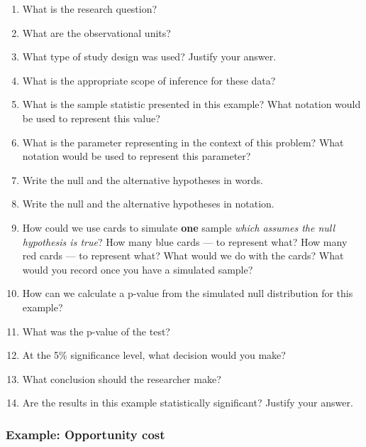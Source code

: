 \documentclass[
]{report}
\newcommand{\rgs}{\vspace{12pt}} %
\begin{document}
\begin{enumerate}
\def\labelenumi{\arabic{enumi}.}
\item
  What is the research question?
  \rgs
\item
  What are the observational units?
  \rgs
\item
  What type of study design was used? Justify your answer.
  \rgs
\item
  What is the appropriate scope of inference for these data?
  \rgs
\item
  What is the sample statistic presented in this example? What notation would be used to represent this value?
  \rgs
\item
  What is the parameter representing in the context of this problem? What notation would be used to represent this parameter?
  \rgs
  \rgs
\item
  Write the null and the alternative hypotheses in words.
  \rgs
  \rgs
\item
  Write the null and the alternative hypotheses in notation.
  \rgs
\item
  How could we use cards to simulate \textbf{one} sample \emph{which assumes the null hypothesis is true}? How many blue cards --- to represent what? How many red cards --- to represent what? What would we do with the cards? What would you record once you have a simulated sample?
  \rgs
  \rgs
  \rgs
\item
  How can we calculate a p-value from the simulated null distribution for this example?
  \rgs
  \rgs
\item
  What was the p-value of the test?
  \rgs
\item
  At the 5\% significance level, what decision would you make?
  \rgs
\item
  What conclusion should the researcher make?
  \rgs
  \rgs
\item
  Are the results in this example statistically significant? Justify your answer.
  \rgs
\end{enumerate}

\hypertarget{example-opportunity-cost}{%
\subsubsection*{Example: Opportunity cost}\label{example-opportunity-cost}}
\end{document}
